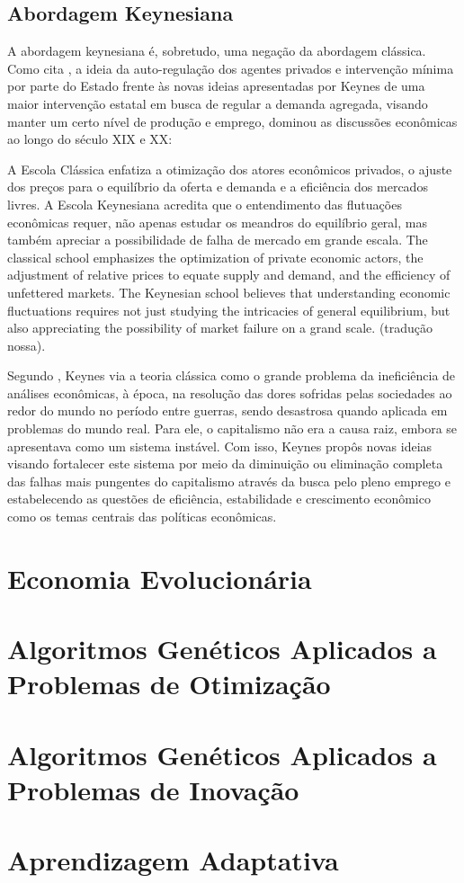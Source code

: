 \subsection{Abordagem Keynesiana}

A abordagem keynesiana é, sobretudo, uma negação da abordagem clássica. Como cita \citeauthor*{mankiw1989}, a ideia da auto-regulação dos agentes privados e intervenção mínima por parte do Estado frente às novas ideias apresentadas por Keynes de uma maior intervenção estatal em busca de regular a demanda agregada, visando manter um certo nível de produção e emprego, dominou as discussões econômicas ao longo do século XIX e XX:

\citacao
{%
	A Escola Clássica enfatiza a otimização dos atores econômicos privados, o ajuste dos preços para o equilíbrio da oferta e demanda e a eficiência dos mercados livres. A Escola Keynesiana acredita que o entendimento das flutuações econômicas requer, não apenas estudar os meandros do equilíbrio geral, mas também apreciar a possibilidade de falha de mercado em grande escala.
}{%
	The classical school emphasizes the optimization of private economic actors, the adjustment of relative prices to equate supply and demand, and the efficiency of unfettered markets. The Keynesian school believes that understanding economic fluctuations requires not just studying the intricacies of general equilibrium, but also appreciating the possibility of market failure on a grand scale.
}
{\citep[pg.79]{mankiw1989}}
{(tradução nossa).}

Segundo , Keynes via a teoria clássica como o grande problema da ineficiência de análises econômicas, à época, na resolução das dores sofridas pelas sociedades ao redor do mundo no período entre guerras, sendo desastrosa quando aplicada em problemas do mundo real. Para ele, o capitalismo não era a causa raiz, embora se apresentava como um sistema instável. Com isso, Keynes propôs novas ideias visando fortalecer este sistema por meio da diminuição ou eliminação completa das falhas mais pungentes do capitalismo através da busca pelo pleno emprego e estabelecendo as questões de eficiência, estabilidade e crescimento econômico como os temas centrais das políticas econômicas.

\section{Economia Evolucionária}

\section{Algoritmos Genéticos Aplicados a Problemas de Otimização}

\section{Algoritmos Genéticos Aplicados a Problemas de Inovação}

\section{Aprendizagem Adaptativa}

